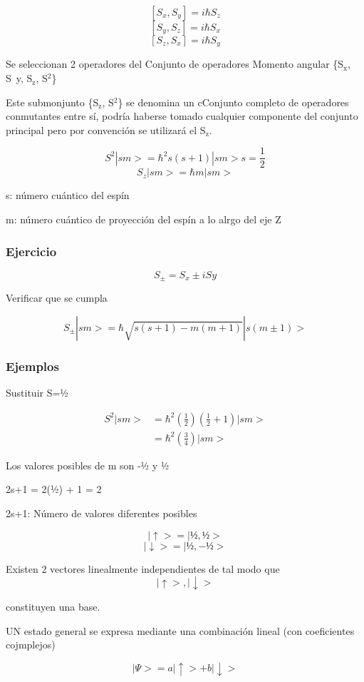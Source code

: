 \documentclass[11pt]{article}
\begin{document}
$$ [S_x,S_y] = i\hbar S_z $$
$$ [S_y,S_z] = i\hbar S_x $$
$$ [S_z,S_x] = i\hbar S_y $$

Se seleccionan 2 operadores del Conjunto de operadores Momento angular
\{S$_{\text{x}}$, S y, S$_{\text{z}}$, S$^{\text{2}}$\}

Este submonjunto \{S$_{\text{z}}$, S$^{\text{2}}$\} se denomina un cConjunto completo de
operadores conmutantes entre sí, podría haberse tomado cualquier
componente del conjunto principal pero por convención se utilizará el
S$_{\text{z}}$.

$$ S^2 |sm> = \hbar^2 s(s+1) |sm>  s= \frac{1}{2} $$
$$ S_z |sm> = \hbar m |sm> $$

s: número cuántico del espín

m: número cuántico de proyección del espín a lo alrgo del eje Z
\subsubsection{Ejercicio}
\label{sec-2-1-1}

$$ S_\pm = S_x \pm iS y $$

Verificar que se cumpla

$$ S_\pm |sm> = \hbar \sqrt{s(s+1) - m(m+1)} |s(m\pm1)> $$
\subsubsection{Ejemplos}
\label{sec-2-1-2}
Sustituir S=½

\begin{equation}
\begin{split}
S^2 |sm> & = \hbar^2 (\frac{1}{2})(\frac{1}{2} + 1) |sm> \\
         & = \hbar^2(\frac{3}{4}) |sm>
\end{split}
\end{equation}

Los valores posibles de m son -½ y ½

2s+1 = 2(½) + 1 = 2

2s+1: Número de valores diferentes posibles

$$ | \uparrow >  = | ½ , ½ >$$
$$ | \downarrow >  = | ½ ,- ½ >$$

Existen 2 vectores linealmente independientes de tal modo que
$$ {|\uparrow>, |\downarrow>} $$

constituyen una base.

UN estado general se expresa mediante una combinación lineal (con coeficientes cojmplejos)

$$ | \Psi > = a |\uparrow > + b | \downarrow> $$
\end{document}

